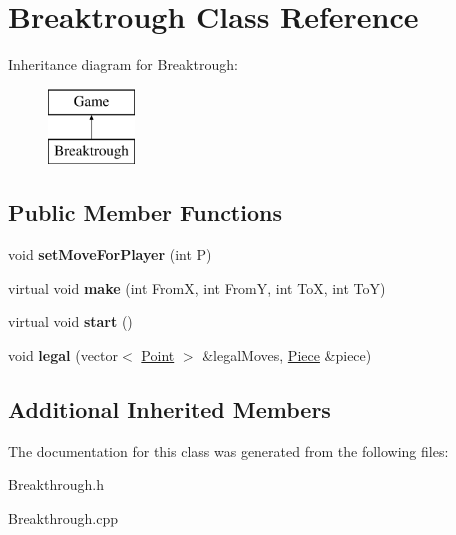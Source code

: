 \hypertarget{class_breaktrough}{\section{Breaktrough Class Reference}
\label{class_breaktrough}
}
Inheritance diagram for Breaktrough\-:\begin{figure}[H]
\begin{center}
\leavevmode
\includegraphics[height=2.000000cm]{class_breaktrough}
\end{center}
\end{figure}
\subsection*{Public Member Functions}
\begin{DoxyCompactItemize}
\item 
\hypertarget{class_breaktrough_a1e1244669a6ab63043329afcdaaeec37}{void {\bfseries set\-Move\-For\-Player} (int P)}\label{class_breaktrough_a1e1244669a6ab63043329afcdaaeec37}

\item 
\hypertarget{class_breaktrough_a07006aa5d9919ddefa68554f3022afc6}{virtual void {\bfseries make} (int From\-X, int From\-Y, int To\-X, int To\-Y)}\label{class_breaktrough_a07006aa5d9919ddefa68554f3022afc6}

\item 
\hypertarget{class_breaktrough_a1e4b2c80e074f7052c4c491abe95c9f6}{virtual void {\bfseries start} ()}\label{class_breaktrough_a1e4b2c80e074f7052c4c491abe95c9f6}

\item 
\hypertarget{class_breaktrough_a6bf5d444ace61244df9a0255fde5d533}{void {\bfseries legal} (vector$<$ \hyperlink{struct_point}{Point} $>$ \&legal\-Moves, \hyperlink{class_piece}{Piece} \&piece)}\label{class_breaktrough_a6bf5d444ace61244df9a0255fde5d533}

\end{DoxyCompactItemize}
\subsection*{Additional Inherited Members}


The documentation for this class was generated from the following files\-:\begin{DoxyCompactItemize}
\item 
Breakthrough.\-h\item 
Breakthrough.\-cpp\end{DoxyCompactItemize}
